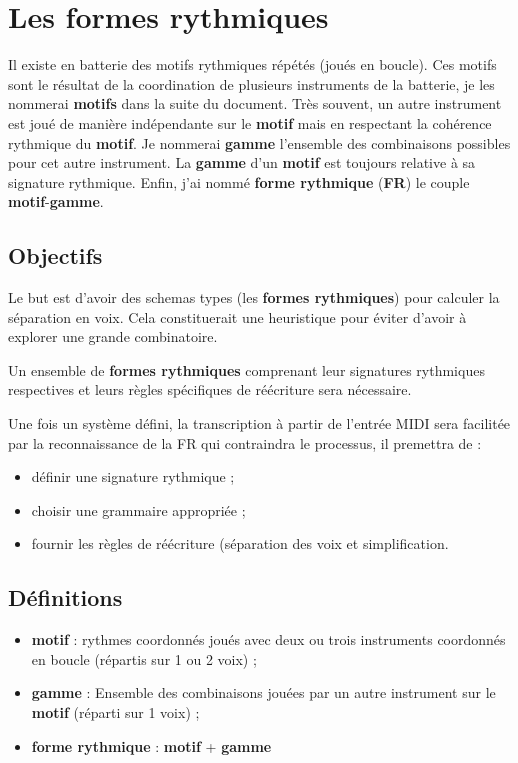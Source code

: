 \section{Les \textbf{formes rythmiques}}
\label{systemes_methodes}
Il existe en batterie des motifs rythmiques répétés (joués en boucle). Ces
motifs sont le résultat de la coordination de plusieurs instruments de la
batterie, je les nommerai \textbf{motifs} dans la suite du document. Très
souvent, un autre instrument est joué de manière indépendante sur le
\textbf{motif} mais en respectant la cohérence rythmique du \textbf{motif}. Je
nommerai \textbf{gamme} l’ensemble des combinaisons possibles pour cet autre
instrument. La \textbf{gamme} d’un \textbf{motif} est toujours relative à sa
signature rythmique. Enfin, j’ai nommé \textbf{forme rythmique} (\textbf{FR})
le couple \textbf{motif}-\textbf{gamme}.

\subsection*{Objectifs}
Le but est d'avoir des schemas types (les \textbf{formes rythmiques}) pour
calculer la séparation en voix. Cela constituerait une heuristique pour éviter
d'avoir à explorer une grande combinatoire.

Un ensemble de \textbf{formes rythmiques} comprenant leur signatures rythmiques
respectives et leurs règles spécifiques de réécriture sera nécessaire.

Une fois un système défini, la transcription à partir de l'entrée MIDI sera
facilitée par la reconnaissance de la FR qui contraindra le processus, il
premettra de :
\begin{itemize}
	\item définir une signature rythmique ;
	\item choisir une grammaire appropriée ;
	\item fournir les règles de réécriture (séparation des voix et
        simplification.
\end{itemize}

\subsection*{Définitions}

\begin{itemize}
    \item \textbf{motif} : rythmes coordonnés joués avec deux ou trois
        instruments coordonnés en boucle (répartis sur 1 ou 2 voix) ;
    \item \textbf{gamme} : Ensemble des combinaisons jouées par un autre
        instrument sur le \textbf{motif} (réparti sur 1 voix) ;
    \item \textbf{forme rythmique} : \textbf{motif} + \textbf{gamme}\\
\end{itemize}

